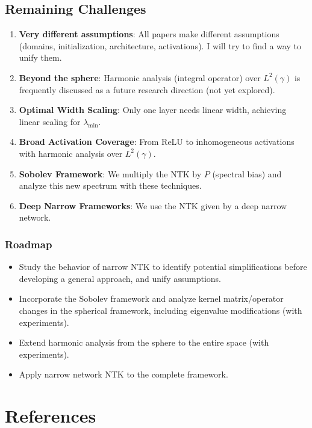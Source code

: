 \documentclass{article}
\newcommand{\lambdaMin}{\lambda_{\min}}
\begin{document}
\subsection{Remaining Challenges}
\begin{enumerate}
    \item \textbf{Very different assumptions}: All papers make different assumptions (domains, initialization, architecture, activations). I will try to find a way to unify them.
    \item \textbf{Beyond the sphere}: Harmonic analysis (integral operator) over $L^2(\gamma)$ is frequently discussed as a future research direction (not yet explored).
    \item \textbf{Optimal Width Scaling}: Only one layer needs linear width, achieving linear scaling for $\lambdaMin$.
    \item \textbf{Broad Activation Coverage}: From ReLU to inhomogeneous activations with harmonic analysis over $L^2(\gamma)$.
    \item \textbf{Sobolev Framework}: We multiply the NTK by $P$ (spectral bias) and analyze this new spectrum with these techniques.
    \item \textbf{Deep Narrow Frameworks}: We use the NTK given by a deep narrow network.
\end{enumerate}

\subsubsection{Roadmap}
\begin{itemize}
    \item Study the behavior of narrow NTK to identify potential simplifications before developing a general approach, and unify assumptions.
    \item Incorporate the Sobolev framework and analyze kernel matrix/operator changes in the spherical framework, including eigenvalue modifications (with experiments).
    \item Extend harmonic analysis from the sphere to the entire space (with experiments).
    \item Apply narrow network NTK to the complete framework.
\end{itemize}



\newpage

\section*{References}
\end{document}

